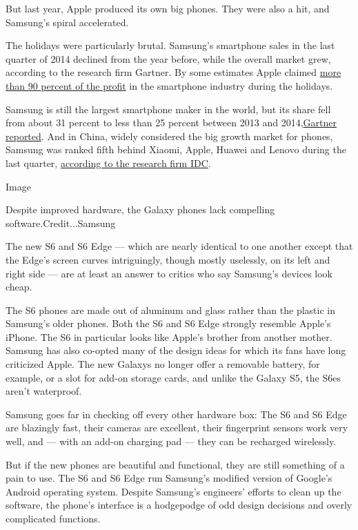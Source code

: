 But last year, Apple produced its own big phones. They were also a hit,
and Samsung's spiral accelerated.

The holidays were particularly brutal. Samsung's smartphone sales in the
last quarter of 2014 declined from the year before, while the overall
market grew, according to the research firm Gartner. By some estimates
Apple claimed
\href{http://blogs.barrons.com/techtraderdaily/2015/02/09/apple-has-93-of-mobile-profits-650m-users-by-2018-says-canaccord/\#9to5mac}{more
than 90 percent of the profit} in the smartphone industry during the
holidays.

Samsung is still the largest smartphone maker in the world, but its
share fell from about 31 percent to less than 25 percent between 2013
and 2014,\href{http://www.gartner.com/newsroom/id/2996817}{Gartner
reported}. And in China, widely considered the big growth market for
phones, Samsung was ranked fifth behind Xiaomi, Apple, Huawei and Lenovo
during the last quarter,
\href{http://www.idc.com/getdoc.jsp?containerId=prHK25437515}{according
to the research firm IDC}.

Image

Despite improved hardware, the Galaxy phones lack compelling
software.Credit...Samsung

The new S6 and S6 Edge --- which are nearly identical to one another
except that the Edge's screen curves intriguingly, though mostly
uselessly, on its left and right side --- are at least an answer to
critics who say Samsung's devices look cheap.

The S6 phones are made out of aluminum and glass rather than the plastic
in Samsung's older phones. Both the S6 and S6 Edge strongly resemble
Apple's iPhone. The S6 in particular looks like Apple's brother from
another mother. Samsung has also co-opted many of the design ideas for
which its fans have long criticized Apple. The new Galaxys no longer
offer a removable battery, for example, or a slot for add-on storage
cards, and unlike the Galaxy S5, the S6es aren't waterproof.

Samsung goes far in checking off every other hardware box: The S6 and S6
Edge are blazingly fast, their cameras are excellent, their fingerprint
sensors work very well, and --- with an add-on charging pad --- they can
be recharged wirelessly.

But if the new phones are beautiful and functional, they are still
something of a pain to use. The S6 and S6 Edge run Samsung's modified
version of Google's Android operating system. Despite Samsung's
engineers' efforts to clean up the software, the phone's interface is a
hodgepodge of odd design decisions and overly complicated functions.

